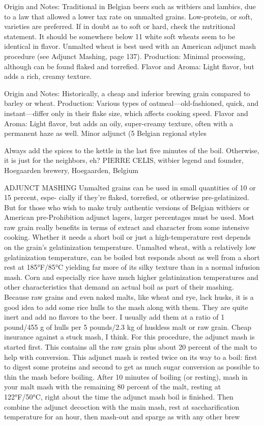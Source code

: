\documentclass[a4paper,parskip=half]{scrartcl}
\begin{document}
\parencite[68]{Mosher2015}
Origin and Notes: Traditional in Belgian beers such as witbiers and lambics,
due to a law that allowed a lower tax rate on unmalted grains. Low-protein,
or soft, varieties are preferred. If in doubt as to soft or hard, check the
nutritional statement. It should be somewhere below 11%
white soft wheats seem to be identical in flavor. Unmalted wheat is best
used with an American adjunct mash procedure (see Adjunct Mashing,
page 137).
Production: Minimal processing, although can be found flaked and torrefied.
Flavor and Aroma: Light flavor, but adds a rich, creamy texture.


\parencite[69]{Mosher2015}
Origin and Notes: Historically, a cheap and inferior brewing grain
compared to barley or wheat.
Production: Various types of oatmeal—old-fashioned, quick, and
instant—differ only in their flake size, which affects cooking speed.
Flavor and Aroma: Light flavor, but adds an oily, super-creamy texture,
often with a permanent haze as well.
Minor adjunct (5%
Belgian regional styles

\parencite[106]{Mosher2015}
Always add the spices
to the kettle in the last
five minutes of the boil.
Otherwise, it is just for
the neighbors, eh?
PIERRE CELIS, witbier legend and
founder, Hoegaarden brewery,
Hoegaarden, Belgium

\parencite[137]{Mosher2015}
ADJUNCT MASHING
Unmalted grains can be used in small quantities of 10 or 15 percent, espe-
cially if they’re flaked, torrefied, or otherwise pre-gelatinized. But for those
who wish to make truly authentic versions of Belgian witbiers or American
pre-Prohibition adjunct lagers, larger percentages must be used. Most raw
grain really benefits in terms of extract and character from some intensive
cooking. Whether it needs a short boil or just a high-temperature rest
depends on the grain’s gelatinization temperature. Unmalted wheat, with a
relatively low gelatinization temperature, can be boiled but responds about
as well from a short rest at 185°F/85°C yielding far more of its silky texture
than in a normal infusion mash. Corn and especially rice have much higher
gelatinization temperatures and other characteristics that demand an actual
boil as part of their mashing.
Because raw grains and even naked malts, like wheat and rye, lack husks,
it is a good idea to add some rice hulls to the mash along with them. They
are quite inert and add no flavors to the beer. I usually add them at a ratio
of 1 pound/455 g of hulls per 5 pounds/2.3 kg of huskless malt or raw grain.
Cheap insurance against a stuck mash, I think.
For this procedure, the adjunct mash is started first. This contains all the
raw grain plus about 20 percent of the malt to help with conversion. This
adjunct mash is rested twice on its way to a boil: first to digest some proteins
and second to get as much sugar conversion as possible to thin the mash
before boiling. After 10 minutes of boiling (or resting), mash in your malt
mash with the remaining 80 percent of the malt, resting at 122°F/50°C, right
about the time the adjunct mash boil is finished. Then combine the adjunct
decoction with the main mash, rest at saccharification temperature for an
hour, then mash-out and sparge as with any other brew
\end{document}

